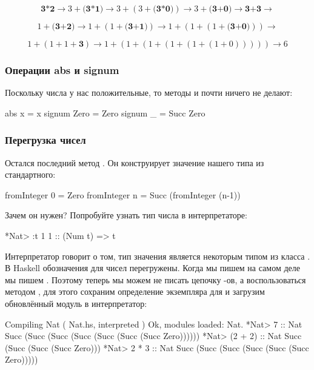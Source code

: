\[\textbf{3*2} \rightarrow 3+\textbf{(3*1)} \rightarrow 
    3+(3+\textbf{(3*0)}) \rightarrow 3+\textbf{(3+0)} 
    \rightarrow \textbf{3+3} \rightarrow\]

\[1+\textbf{(3+2)} \rightarrow 1+(1+\textbf{(3+1)}) \rightarrow
    1+(1+(1+\textbf{(3+0)})) \rightarrow\]

\[1+(1+1+\textbf{3}) \rightarrow 1+(1+(1+(1+(1+(1+0))))) \rightarrow 6\]

\subsubsection{Операции abs и signum}

Поскольку числа у нас положительные, то методы  и 
почти ничего не делают:


\begin{code}
    abs    x    = x 
    signum Zero = Zero
    signum _    = Succ Zero
\end{code}

\subsubsection{Перегрузка чисел}

Остался последний метод . Он конструирует значение
нашего типа из стандартного:


\begin{code}
    fromInteger 0 = Zero
    fromInteger n = Succ (fromInteger (n-1))
\end{code}

Зачем он нужен? Попробуйте узнать тип числа  в интерпретаторе:


\begin{code}
*Nat> :t 1
1 :: (Num t) => t
\end{code}

Интерпретатор говорит о том, тип значения  является некоторым
типом из класса . В Haskell обозначения для чисел перегружены.
Когда мы пишем  на самом деле мы пишем
. Поэтому теперь мы можем не писать
цепочку -ов, а воспользоваться методом , для
этого сохраним определение экземпляра для  и загрузим
обновлённый модуль в интерпретатор:


\begin{code}
[1 of 1] Compiling Nat              ( Nat.hs, interpreted )
Ok, modules loaded: Nat.
*Nat> 7 :: Nat
Succ (Succ (Succ (Succ (Succ (Succ (Succ Zero))))))
*Nat> (2 + 2) :: Nat
Succ (Succ (Succ (Succ Zero)))
*Nat> 2 * 3 :: Nat
Succ (Succ (Succ (Succ (Succ (Succ Zero)))))
\end{code}

